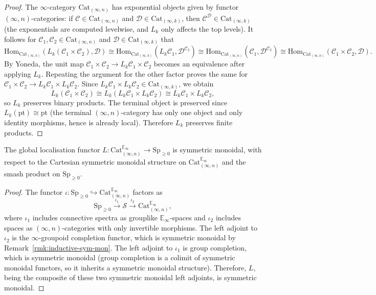 \documentclass{amsart}
\begin{document}
\begin{proof}
The $\infty$-category $\mathrm{Cat}_{(\infty,n)}$ has exponential objects given by functor $(\infty,n)$-categories: if $\mathcal{C} \in \mathrm{Cat}_{(\infty,n)}$ and $\mathcal{D} \in \mathrm{Cat}_{(\infty,k)}$, then $\mathcal{C}^{\mathcal{D}} \in \mathrm{Cat}_{(\infty,k)}$ (the exponentials are computed levelwise, and $L_k$ only affects the top levels). It follows for $\mathcal{C}_1, \mathcal{C}_2 \in \mathrm{Cat}_{(\infty,n)}$ and $\mathcal{D} \in \mathrm{Cat}_{(\infty,k)}$ that
\[
\mathrm{Hom}_{\mathrm{Cat}_{(\infty,k)}}(L_k(\mathcal{C}_1 \times \mathcal{C}_2), \mathcal{D}) \cong \mathrm{Hom}_{\mathrm{Cat}_{(\infty,k)}}(L_k \mathcal{C}_1, \mathcal{D}^{\mathcal{C}_2}) \cong \mathrm{Hom}_{\mathrm{Cat}_{(\infty,n)}}(\mathcal{C}_1, \mathcal{D}^{\mathcal{C}_2}) \cong \mathrm{Hom}_{\mathrm{Cat}_{(\infty,n)}}(\mathcal{C}_1 \times \mathcal{C}_2, \mathcal{D}).
\]
By Yoneda, the unit map $\mathcal{C}_1 \times \mathcal{C}_2 \to L_k \mathcal{C}_1 \times \mathcal{C}_2$ becomes an equivalence after applying $L_k$. Repeating the argument for the other factor proves the same for $\mathcal{C}_1 \times \mathcal{C}_2 \to L_k \mathcal{C}_1 \times L_k \mathcal{C}_2$. Since $L_k \mathcal{C}_1 \times L_k \mathcal{C}_2 \in \mathrm{Cat}_{(\infty,k)}$, we obtain
\[
L_k(\mathcal{C}_1 \times \mathcal{C}_2) \cong L_k(L_k \mathcal{C}_1 \times L_k \mathcal{C}_2) \cong L_k \mathcal{C}_1 \times L_k \mathcal{C}_2,
\]
so $L_k$ preserves binary products. The terminal object is preserved since $L_k(\mathrm{pt}) \cong \mathrm{pt}$ (the terminal $(\infty,n)$-category has only one object and only identity morphisms, hence is already local). Therefore $L_k$ preserves finite products.
\end{proof}

\begin{lemma}
\label{lem:L-symmetric-monoidal}
The global localisation functor $L \colon \mathrm{Cat}_{(\infty,n)}^{\mathbb{E}_\infty} \to \mathrm{Sp}_{\geq 0}$ is symmetric monoidal, with respect to the Cartesian symmetric monoidal structure on $\mathrm{Cat}_{(\infty,n)}^{\mathbb{E}_\infty}$ and the smash product on $\mathrm{Sp}_{\geq 0}$.
\end{lemma}

\begin{proof}
The functor $\iota \colon \mathrm{Sp}_{\geq 0} \hookrightarrow \mathrm{Cat}_{(\infty,n)}^{\mathbb{E}_\infty}$ factors as
\[
\mathrm{Sp}_{\geq 0} \xrightarrow{\ \iota_1\ } \mathcal{S} \xrightarrow{\ \iota_2\ } \mathrm{Cat}_{(\infty,n)}^{\mathbb{E}_\infty},
\]
where $\iota_1$ includes connective spectra as grouplike $\mathbb{E}_\infty$-spaces and $\iota_2$ includes spaces as $(\infty,n)$-categories with only invertible morphisms. The left adjoint to $\iota_2$ is the $\infty$-groupoid completion functor, which is symmetric monoidal by Remark~\ref{rmk:inductive-sym-mon}. The left adjoint to $\iota_1$ is group completion, which is symmetric monoidal (group completion is a colimit of symmetric monoidal functors, so it inherits a symmetric monoidal structure). Therefore, $L$, being the composite of these two symmetric monoidal left adjoints, is symmetric monoidal.
\end{proof}
\end{document}
